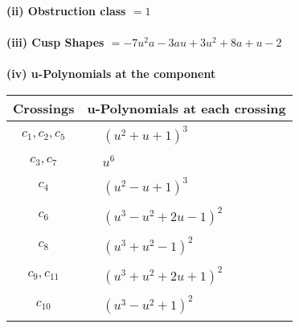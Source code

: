 \documentclass[1p]{elsarticle_modified}
\theoremstyle{definition}
\begin{document}
\flushleft \textbf{(ii) Obstruction class $= 1$}\\~\\
\flushleft \textbf{(iii) Cusp Shapes $= -7 u^2 a-3 a u+3 u^2+8 a+u-2$}\\~\\
\newpage\renewcommand{\arraystretch}{1}
\flushleft \textbf{(iv) u-Polynomials at the component}\newline \\
\begin{tabular}{m{50pt}|m{274pt}}
Crossings & \hspace{64pt}u-Polynomials at each crossing \\
\hline $$\begin{aligned}c_{1},c_{2},c_{5}\end{aligned}$$&$\begin{aligned}
&(u^2+u+1)^3
\end{aligned}$\\
\hline $$\begin{aligned}c_{3},c_{7}\end{aligned}$$&$\begin{aligned}
&u^6
\end{aligned}$\\
\hline $$\begin{aligned}c_{4}\end{aligned}$$&$\begin{aligned}
&(u^2- u+1)^3
\end{aligned}$\\
\hline $$\begin{aligned}c_{6}\end{aligned}$$&$\begin{aligned}
&(u^3- u^2+2 u-1)^2
\end{aligned}$\\
\hline $$\begin{aligned}c_{8}\end{aligned}$$&$\begin{aligned}
&(u^3+u^2-1)^2
\end{aligned}$\\
\hline $$\begin{aligned}c_{9},c_{11}\end{aligned}$$&$\begin{aligned}
&(u^3+u^2+2 u+1)^2
\end{aligned}$\\
\hline $$\begin{aligned}c_{10}\end{aligned}$$&$\begin{aligned}
&(u^3- u^2+1)^2
\end{aligned}$\\
\hline
\end{tabular}\\~\\
\end{document}

